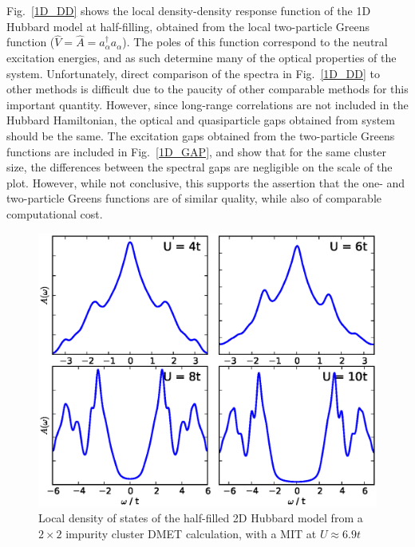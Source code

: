 \documentclass[aps,showpacs,twocolumn,nobibnotes]{revtex4}
\begin{document}
Fig.~\ref{1D_DD} shows the local density-density response function of the 1D Hubbard model at half-filling, obtained from the local two-particle Greens 
function (${\hat V}={\hat A}=a_{\alpha}^{\dagger}a_{\alpha}$). The poles of this function correspond to the neutral excitation energies, and as such determine 
many of the optical properties of the system\cite{Millis2012,Essler91}.
Unfortunately, direct comparison of the spectra in Fig.~\ref{1D_DD} to other methods is difficult due to the paucity of other comparable methods for this important quantity.
However, since long-range correlations are not included in the Hubbard Hamiltonian, 
the optical and quasiparticle gaps obtained from system should be the same. The excitation gaps
obtained from the two-particle Greens functions are included in Fig.~\ref{1D_GAP}, and show that for the same cluster size, the differences between the spectral gaps are negligible 
on the scale of the plot. However, while not conclusive, this supports the assertion that the one- and two-particle Greens functions are of similar quality, while also of comparable computational cost.

\begin{figure}
\begin{center}
    \vspace{-2mm}
\includegraphics[scale=0.475]{Plots/2D_Spectra/2DHub_Spectra.eps}
\end{center}
    \vspace{-8mm}
\caption{Local density of states of the half-filled 2D Hubbard model from a $2 \times 2$ impurity cluster DMET calculation, with a MIT at $U\approx6.9t$}
\label{2D_DOS}
\end{figure}
\end{document}
